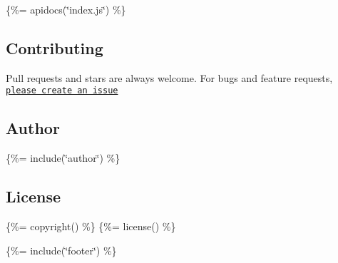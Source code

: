 \{\%= apidocs(\char`\"{}index.\+js\char`\"{}) \%\}

\subsection*{Contributing}

Pull requests and stars are always welcome. For bugs and feature requests, \href{{%

\subsection*{Author}

\{\%= include(\char`\"{}author\char`\"{}) \%\}

\subsection*{License}

\{\%= copyright() \%\} \{\%= license() \%\}





\{\%= include(\char`\"{}footer\char`\"{}) \%\} 